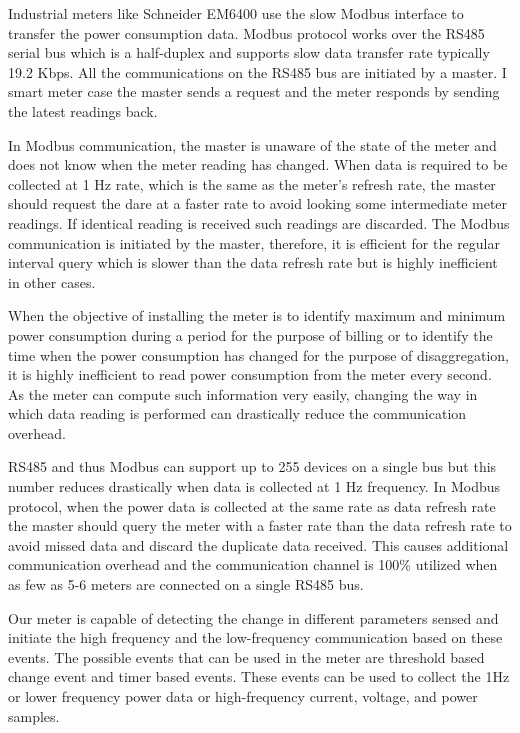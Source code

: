 Industrial meters like Schneider EM6400 \cite{EM6400MultifunctionMeter} use the slow Modbus interface to transfer the power consumption data. Modbus protocol works over the RS485 serial bus which is a half-duplex and supports slow data transfer rate typically 19.2 Kbps. All the communications on the RS485 bus are initiated by a master. I smart meter case the master sends a  request and the meter responds by sending the latest readings back.

In Modbus communication, the master is unaware of the state of the meter and does not know when the meter reading has changed. When data is required to be collected at 1 Hz rate, which is the same as the meter's refresh rate, the master should request the dare at a faster rate to avoid looking some intermediate meter readings. If identical reading is received such readings are discarded. The Modbus communication is initiated by the master, therefore, it is efficient for the regular interval query which is slower than the data refresh rate but is highly inefficient in other cases.

When the objective of installing the meter is to identify maximum and minimum power consumption during a period for the purpose of billing or to identify the time when the power consumption has changed for the purpose of disaggregation, it is highly inefficient to read power consumption from the meter every second. As the meter can compute such information very easily, changing the way in which data reading is performed can drastically reduce the communication overhead.

RS485 and thus Modbus can support up to 255 devices on a single bus but this number reduces drastically when data is collected at 1 Hz frequency. In Modbus protocol, when the power data is collected at the same rate as data refresh rate the master should query the meter with a faster rate than the data refresh rate to avoid missed data and discard the duplicate data received. This causes additional communication overhead and the communication channel is 100\% utilized when as few as 5-6 meters are connected on a single RS485 bus.

Our meter is capable of detecting the change in different parameters sensed and initiate the high frequency and the low-frequency communication based on these events. The possible events that can be used in the meter are threshold based change event and timer based events. These events can be used to collect the 1Hz or lower frequency power data or high-frequency current, voltage, and power samples.


